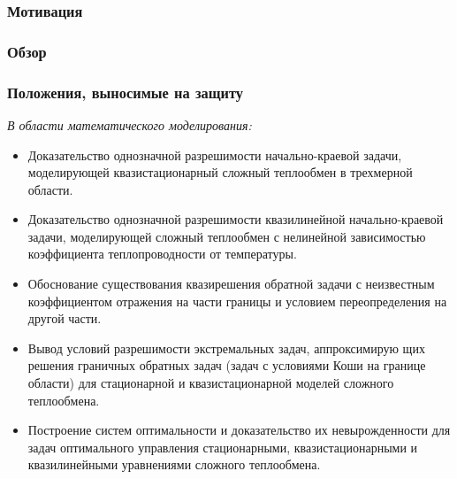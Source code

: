 \begin{frame}
    \setcounter{framenumber}{1}
    \maketitle
\end{frame}


\begin{frame}
    \frametitle{Мотивация}

\end{frame}


\begin{frame}
    \frametitle{Обзор}

\end{frame}


\begin{frame}
    \frametitle{Положения, выносимые на защиту}
    \textit{В области математического моделирования:}
    \begin{itemize}
        \item Доказательство однозначной разрешимости начально-краевой задачи,
        моделирующей квазистационарный сложный теплообмен в трехмерной
        области.
        \item Доказательство однозначной разрешимости квазилинейной начально-краевой задачи,
        моделирующей сложный теплообмен с нелинейной
        зависимостью коэффициента теплопроводности от температуры.
        \item Обоснование существования квазирешения обратной задачи с неизвестным
        коэффициентом отражения на части границы и условием
        переопределения на другой части.
        \item Вывод условий разрешимости экстремальных задач, аппроксимирую
        щих решения граничных обратных задач (задач с условиями Коши на границе области)
        для стационарной и квазистационарной моделей сложного теплообмена.
        \item Построение систем оптимальности и доказательство их невырожденности для задач оптимального управления стационарными, квазистационарными
        и квазилинейными уравнениями сложного теплообмена.
    \end{itemize}
\end{frame}



